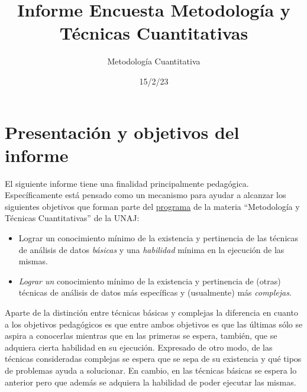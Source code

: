 \documentclass[
  letterpaper,
  DIV=11,
  numbers=noendperiod]{scrreprt}
\title{Informe Encuesta Metodología y Técnicas Cuantitativas}
\author{Metodología Cuantitativa}
\date{15/2/23}
\renewcommand*\contentsname{Tabla de contenidos}
\newcommand\contentsname{Tabla de contenidos}
\begin{document}
\maketitle
\ifdefined\Shaded\renewenvironment{Shaded}{\begin{tcolorbox}[enhanced, breakable, borderline west={3pt}{0pt}{shadecolor}, frame hidden, interior hidden, sharp corners, boxrule=0pt]}{\end{tcolorbox}}\fi

\renewcommand*\contentsname{Tabla de contenidos}
{
\hypersetup{linkcolor=}
\setcounter{tocdepth}{2}
\tableofcontents
}

\hypertarget{presentaciuxf3n-y-objetivos-del-informe}{%
\chapter*{Presentación y objetivos del
informe}\label{presentaciuxf3n-y-objetivos-del-informe}}


El siguiente informe tiene una finalidad principalmente pedagógica.
Específicamente está pensado como un mecanismo para ayudar a alcanzar
los siguientes objetivos que forman parte del
\href{https://docs.google.com/document/d/15ZuHJ1ZM7Z0g0Edt-mv1PCB697-x6-rZfcWdAtd85yM/edit\#heading=h.s43n504lcmmx}{programa}
de la materia ``Metodología y Técnicas Cuantitativas'' de la UNAJ:

\begin{itemize}
\item
  Lograr un conocimiento mínimo de la existencia y pertinencia de las
  técnicas de análisis de datos \emph{básicas} y una \emph{habilidad}
  mínima en la ejecución de las mismas.
\item
  \emph{Lograr un} conocimiento mínimo de la existencia y pertinencia de
  (otras) técnicas de análisis de datos más específicas y (usualmente)
  más \emph{complejas}.
\end{itemize}

Aparte de la distinción entre técnicas básicas y complejas la diferencia
en cuanto a los objetivos pedagógicos es que entre ambos objetivos es
que las últimas sólo se aspira a conocerlas mientras que en las primeras
se espera, también, que se adquiera cierta habilidad en su ejecución.
Expresado de otro modo, de las técnicas consideradas complejas se espera
que se sepa de su existencia y qué tipos de problemas ayuda a
solucionar. En cambio, en las técnicas básicas se espera lo anterior
pero que además se adquiera la habilidad de poder ejecutar las mismas.
\end{document}

